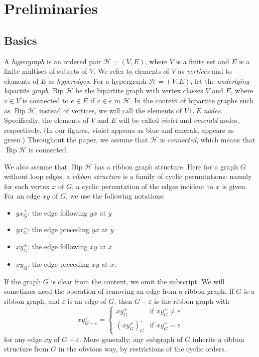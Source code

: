 \documentclass[ALCO,ThmDefs,Unicode,epreuves]{cedram}
\newcommand{\HH}{\mathcal H}
\DeclareMathOperator{\bip}{Bip}
\begin{document}
\section{Preliminaries} \label{sec:prelim}


\subsection{Basics}

A \emph{hypergraph} is an ordered pair $\HH=(V,E)$, where $V$ is a finite set and $E$ is a finite multiset of subsets of $V$. We refer to elements of $V$ as \emph{vertices} and to elements of $E$ as \emph{hyperedges}. For a hypergraph $\mathcal{H}=(V,E)$, let the \emph{underlying bipartite graph} $\bip\HH$ be the bipartite graph with vertex classes $V$ and $E$, where $v\in V$ is connected to $e\in E$ if $v\in e$ in $\HH$. In the context of bipartite graphs such as $\bip\HH$, instead of vertices, we will call the elements of $V\cup E$ \emph{nodes}. Specifically, the elements of $V$ and $E$ will be called \emph{violet} and \emph{emerald} nodes, respectively. (In our figures, violet appears as blue and emerald appears as green.) Throughout the paper, we assume that $\HH$ is \emph{connected}, which means that $\bip \HH$ is connected.

We also assume that $\bip\HH$ has a ribbon graph structure. Here for a graph $G$ without loop edges, a \emph{ribbon structure} is a family of cyclic permutations: namely for each vertex $x$ of $G$, a cyclic permutation of the edges incident to $x$ is given. For an edge $xy$ of $G$, we use the following notations:
\begin{itemize}
\item $yx^+_G$: the edge following $yx$ at $y$
\item $yx^-_G$: the edge preceding $yx$ at $y$
\item $xy^+_G$: the edge following $xy$ at $x$
\item $xy^-_G$: the edge preceding $xy$ at $x$.
\end{itemize}
If the graph $G$ is clear from the context, we omit the subscript. We will sometimes need the operation of removing an edge from a ribbon graph. If $G$ is a ribbon graph, and $\varepsilon$ is an edge of $G$, then $G-\varepsilon$ is the ribbon graph with
\[
xy^+_{G-\varepsilon}= \begin{cases} xy_G^+ & \text{if } xy_G^+\neq \varepsilon \\
(xy_G^+)_G^+ & \text{if } xy_G^+=\varepsilon
\end{cases} 
\]
for any edge $xy$ of $G-\varepsilon$. More generally, any subgraph of $G$ inherits a ribbon structure from $G$ in the obvious way, by restrictions of the cyclic orders.
\end{document}
